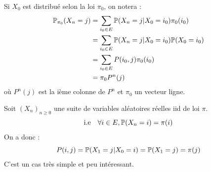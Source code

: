 



\begin{remark}[Notation]
    Si $X_0$ est distribué selon la loi $ \pi_0$, on notera : 
        \begin{align*}
            \mathbb{P}_{ \pi_0} (X_n = j) &= \sum_{i_0 \in E} \mathbb{P}(X_n = j | X_0 = i_0) \pi_0(i_0) \\ 
            &= \sum_{i_0 \in E} \mathbb{P}(X_n = j | X_0 = i_0) \mathbb{P}(X_0 = i_0) \\ 
            &= \sum_{i_0 \in  E} P(i_0, j) \pi_0(i_0) \\ 
            &= \pi_0 P^n(j) 
        \end{align*}
    où  $P^n(j) $ est la ième colonne de $P^n$ et $ \pi_0$ un vecteur ligne. 
\end{remark}

\begin{example}[Simple]
    Soit $(X_n)_{n \geqslant 0}$ une suite de variables aléatoires réelles iid de loi $ \pi$. 
        \[ \text{i.e} \quad \forall i \in E, \mathbb{P}(X_n = i) = \pi(i) \] 
    On a donc : 
        \[ P(i,j) = \mathbb{P}(X_1 = j | X_0 = i ) = \mathbb{P}(X_1 = j) = \pi(j) \] 
    C'est un cas très simple et peu intéressant.
\end{example} 


